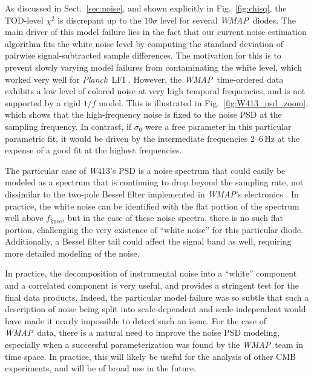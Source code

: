 \documentclass[twocolumn]{../../common/aa}
\def\WMAP{\emph{WMAP}}
\def\Planck{\emph{Planck}}
\newcommand{\W}[0]{\textit W}
\begin{document}
As discussed in Sect.~\ref{sec:noise}, and shown explicitly in Fig.~\ref{fig:chisq}, the TOD-level $\chi^2$ is discrepant up to the $10\sigma$ level for several \WMAP\ diodes. The main driver of this model failure lies in the fact that our current noise estimation algorithm fits the white noise level by computing the standard deviation of pairwise signal-subtracted sample differences. The motivation for this is to prevent slowly varying model failures from contaminating the white level, which worked very well for \Planck\ LFI \citep{bp06}. However, the \WMAP\ time-ordered data exhibits a low level of colored noise at very high temporal frequencies, and is not supported by a rigid $1/f$ model. This is illustrated in Fig.~\ref{fig:W413_psd_zoom}, which shows that the high-frequency noise is fixed to the noise PSD at the sampling frequency. In contrast, if $\sigma_0$ were a free parameter in this particular parametric fit, it would be driven by the intermediate frequencies 2--6\,Hz at the expense of a good fit at the highest frequencies.



The particular case of \W413's PSD is a noise spectrum that could easily be modeled as a spectrum that is continuing to drop beyond the sampling rate, not dissimilar to the two-pole Bessel filter implemented in \WMAP's electronics \citep{jarosik2003:MAP}. In practice, the white noise can be identified with the flat portion of the spectrum well above $f_\mathrm{knee}$, but in the case of these noise spectra, there is no such flat portion, challenging the very existence of ``white noise'' for this particular diode. Additionally, a Bessel filter tail could affect the signal band as well, requiring more detailed modeling of the noise.

In practice, the decomposition of instrumental noise into a ``white'' component and a correlated component is very useful, and provides a stringent test for the final data products. Indeed, the particular model failure was so subtle that such a description of noise being split into scale-dependent and scale-independent would have made it nearly impossible to detect such an issue.
For the case of \WMAP\ data, there is a natural need to improve the noise PSD modeling, especially when a successful parameterization was found by the \WMAP\ team in time space. In practice, this will likely be useful for the analysis of other CMB experiments, and will be of broad use in the future.
\end{document}
